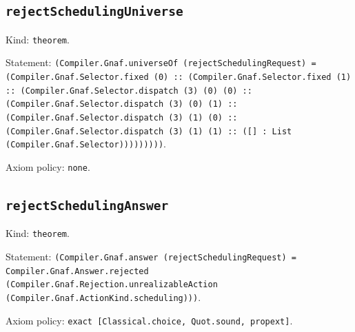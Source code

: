 \documentclass[11pt]{article}
\begin{document}
\subsection*{\texttt{rejectSchedulingUniverse}}
\noindent Kind: \texttt{theorem}.\par
\noindent Statement: \texttt{(Compiler.Gnaf.universeOf (rejectSchedulingRequest) = (Compiler.Gnaf.Selector.fixed (0) :: (Compiler.Gnaf.Selector.fixed (1) :: (Compiler.Gnaf.Selector.dispatch (3) (0) (0) :: (Compiler.Gnaf.Selector.dispatch (3) (0) (1) :: (Compiler.Gnaf.Selector.dispatch (3) (1) (0) :: (Compiler.Gnaf.Selector.dispatch (3) (1) (1) :: ([] : List (Compiler.Gnaf.Selector)))))))))}.\par
\noindent Axiom policy: \texttt{none}.\par
\subsection*{\texttt{rejectSchedulingAnswer}}
\noindent Kind: \texttt{theorem}.\par
\noindent Statement: \texttt{(Compiler.Gnaf.answer (rejectSchedulingRequest) = Compiler.Gnaf.Answer.rejected (Compiler.Gnaf.Rejection.unrealizableAction (Compiler.Gnaf.ActionKind.scheduling)))}.\par
\noindent Axiom policy: \texttt{exact [Classical.choice, Quot.sound, propext]}.\par
\end{document}

